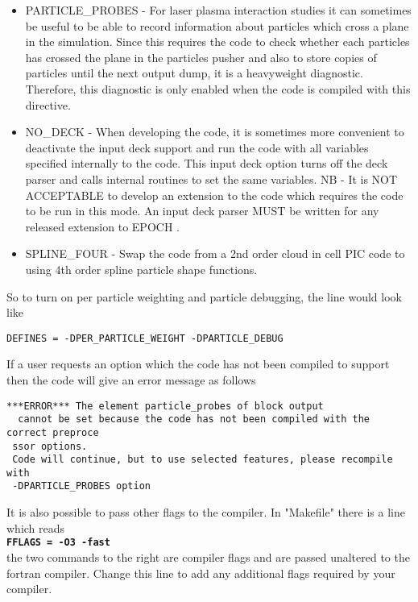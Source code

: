 \documentclass[12pt]{article}
\newcommand{\simpleboxverbatim}{\begin{Verbatim}[obeytabs=true,frame=single,
  framerule=0.5mm,rulecolor=\color{warwickmid}]}
\newcommand{\inlinecode}[1]{{\color{warwickred} \bf\texttt{#1}}}
\newcommand{\EPOCH}{{\color{warwickdark}\fontfamily{phv}\selectfont EPOCH} }
\begin{document}
\begin{itemize}
  tracer particles. Tracer particles are specified like normal particles, and
  move about as would a normal particle with the same charge and mass, but
  tracer particles do not generate any current and are therefore passive
  elements in the simulation. Any attempt to add particle collision effects
  should remember that tracer species should not interact through collisions.
\item PARTICLE\_PROBES - For laser plasma interaction studies it can sometimes
  be useful to be able to record information about particles which cross a
  plane in the simulation. Since this requires the code to check whether each
  particles has crossed the plane in the particles pusher and also to store
  copies of particles until the next output dump, it is a heavyweight
  diagnostic. Therefore, this diagnostic is only enabled when the code is
  compiled with this directive.
\item NO\_DECK - When developing the code, it is sometimes more convenient to
  deactivate the input deck support and run the code with all variables
  specified internally to the code. This input deck option turns off the deck
  parser and calls internal routines to set the same variables. NB - It is NOT
  ACCEPTABLE to develop an extension to the code which requires the code to be
  run in this mode. An input deck parser MUST be written for any released
  extension to \EPOCH.
\item SPLINE\_FOUR - Swap the code from a 2nd order cloud in cell PIC code to
  using 4th order spline particle shape functions.
\end{itemize}

So to turn on per particle weighting and particle debugging, the line would
look like\\
\simpleboxverbatim
DEFINES = -DPER_PARTICLE_WEIGHT -DPARTICLE_DEBUG
\end{Verbatim}

If a user requests an option which the code has not been compiled to support
then the code will give an error message as follows
\simpleboxverbatim
 ***ERROR*** The element particle_probes of block output
  cannot be set because the code has not been compiled with the correct preproce
 ssor options.
 Code will continue, but to use selected features, please recompile with
 -DPARTICLE_PROBES option
\end{Verbatim}

It is also possible to pass other flags to the compiler. In "Makefile" there is
a line which reads\\
\inlinecode{FFLAGS = -O3 -fast}\\
the two commands to the right are compiler flags and are passed unaltered to
the fortran compiler. Change this line to add any additional flags required by
your compiler.
\end{document}
